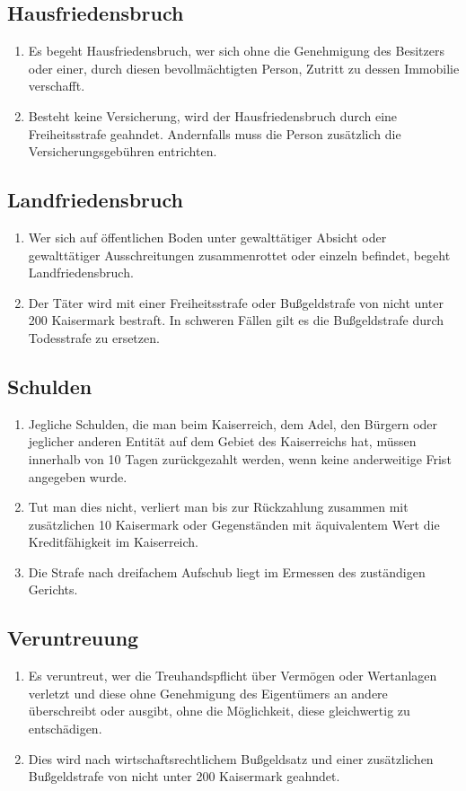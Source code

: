 \documentclass{article}
\begin{document}
\subsection{Hausfriedensbruch}\label{hausfr}
\begin{enumerate}[(1)]
    \item Es begeht Hausfriedensbruch, wer sich ohne die Genehmigung des Besitzers oder einer, durch diesen bevollmächtigten Person, Zutritt zu dessen Immobilie verschafft.
    \item Besteht keine Versicherung, wird der Hausfriedensbruch durch eine Freiheitsstrafe geahndet. Andernfalls muss die Person zusätzlich die Versicherungsgebühren entrichten.
\end{enumerate}

\subsection{Landfriedensbruch}
\begin{enumerate}[(1)]
    \item Wer sich auf öffentlichen Boden unter gewalttätiger Absicht oder gewalttätiger Ausschreitungen zusammenrottet oder einzeln befindet, begeht Landfriedensbruch.
    \item Der Täter wird mit einer Freiheitsstrafe oder Bußgeldstrafe von nicht unter 200 Kaisermark bestraft. In schweren Fällen gilt es die Bußgeldstrafe durch Todesstrafe zu ersetzen.
\end{enumerate}

\subsection{Schulden}
\begin{enumerate}[(1)]
    \item Jegliche Schulden, die man beim Kaiserreich, dem Adel, den Bürgern oder jeglicher anderen Entität auf dem Gebiet des Kaiserreichs hat, müssen innerhalb von 10 Tagen zurückgezahlt werden, wenn keine anderweitige Frist angegeben wurde.
    \item Tut man dies nicht, verliert man bis zur Rückzahlung zusammen mit zusätzlichen 10 Kaisermark oder Gegenständen mit äquivalentem Wert die Kreditfähigkeit im Kaiserreich.
    \item Die Strafe nach dreifachem Aufschub liegt im Ermessen des zuständigen Gerichts.    
\end{enumerate}

\subsection{Veruntreuung}
\begin{enumerate}[(1)]
    \item Es veruntreut, wer die Treuhandspflicht über Vermögen oder Wertanlagen verletzt und diese ohne Genehmigung des Eigentümers an andere überschreibt oder ausgibt, ohne die Möglichkeit, diese gleichwertig zu entschädigen.
    \item Dies wird nach wirtschaftsrechtlichem Bußgeldsatz und einer zusätzlichen Bußgeldstrafe von nicht unter 200 Kaisermark geahndet.
\end{enumerate}
\end{document}
